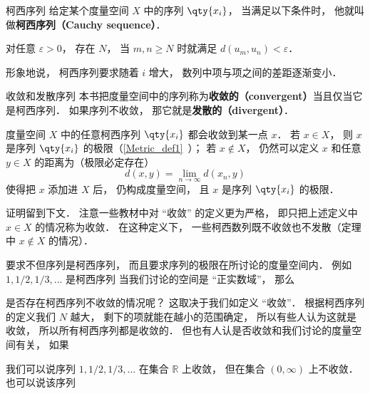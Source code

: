 

\begin{definition}{柯西序列}
给定某个度量空间 $X$ 中的序列 $\qty{x_i}$， 当满足以下条件时， 他就叫做\textbf{柯西序列（Cauchy sequence）}．

对任意 $\varepsilon > 0$， 存在 $N$， 当 $m, n \geqslant N$ 时就满足 $d(u_m, u_n) < \varepsilon$．
\end{definition}

形象地说， 柯西序列要求随着 $i$ 增大， 数列中项与项之间的差距逐渐变小．

\begin{definition}{收敛和发散序列}\label{cauchy_def1}
本书把度量空间中的序列称为\textbf{收敛的（convergent）}当且仅当它是柯西序列． 如果序列不收敛， 那它就是\textbf{发散的（divergent）}．
\end{definition}

\begin{theorem}{}
度量空间 $X$ 中的任意柯西序列 $\qty{x_i}$ 都会收敛到某一点 $x$． 若 $x \in X$， 则 $x$ 是序列 $\qty{x_i}$ 的极限（\autoref{Metric_def1}~）； 若 $x \notin X$， 仍然可以定义 $x$ 和任意 $y\in X$ 的距离为（极限必定存在）
\begin{equation}
d(x, y) = \lim_{n\to\infty} d(x_n, y)
\end{equation}
使得把 $x$ 添加进 $X$ 后， 仍构成度量空间， 且 $x$ 是序列 $\qty{x_i}$ 的极限．
\end{theorem}
证明留到下文． 注意一些教材中对 “收敛” 的定义更为严格， 即只把上述定义中 $x \in X$ 的情况称为收敛． 在这种定义下， 一些柯西数列既不收敛也不发散（定理中 $x\notin X$ 的情况）．



要求不但序列是柯西序列， 而且要求序列的极限在所讨论的度量空间内． 例如 $1, 1/2, 1/3, \dots$ 是柯西序列    当我们讨论的空间是 “正实数域”， 那么





是否存在柯西序列不收敛的情况呢？ 这取决于我们如定义 “收敛”． 根据柯西序列的定义我们 $N$ 越大， 剩下的项就能在越小的范围确定， 所以有些人认为这就是收敛， 所以所有柯西序列都是收敛的． 但也有人认是否收敛和我们讨论的度量空间有关， 如果
\begin{example}{}
我们可以说序列 $1, 1/2, 1/3, \dots$ 在集合 $\mathbb R$ 上收敛， 但在集合 $(0, \infty)$ 上不收敛． 也可以说该序列
\end{example}

